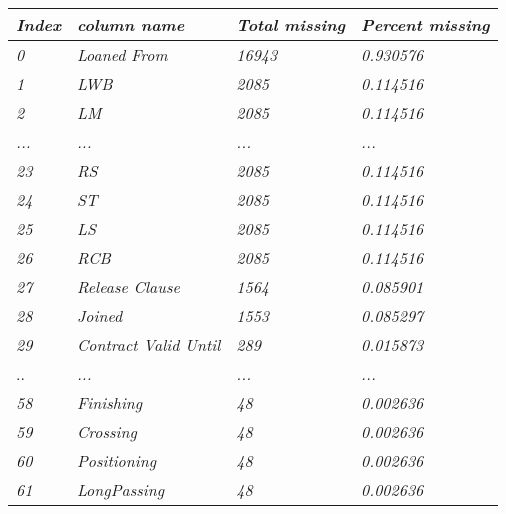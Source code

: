 \documentclass{article}
\begin{document}
\begin{table}[]
\begin{tabular}{|l|l|l|l|}
\hline
\textit{Index} & \textit{column name}          & \textit{Total missing} & \textit{Percent missing} \\ \hline
\textit{0}     & \textit{Loaned From}          & \textit{16943}         & \textit{0.930576}        \\ \hline
\textit{1}     & \textit{LWB}                  & \textit{2085}          & \textit{0.114516}        \\ \hline
\textit{2}     & \textit{LM}                   & \textit{2085}          & \textit{0.114516}        \\ \hline
\textit{...}   & \textit{...}                  & \textit{...}           & \textit{...}             \\ \hline
\textit{23}    & \textit{RS}                   & \textit{2085}          & \textit{0.114516}        \\ \hline
\textit{24}    & \textit{ST}                   & \textit{2085}          & \textit{0.114516}        \\ \hline
\textit{25}    & \textit{LS}                   & \textit{2085}          & \textit{0.114516}        \\ \hline
\textit{26}    & \textit{RCB}                  & \textit{2085}          & \textit{0.114516}        \\ \hline
\textit{27}    & \textit{Release Clause}       & \textit{1564}          & \textit{0.085901}        \\ \hline
\textit{28}    & \textit{Joined}               & \textit{1553}          & \textit{0.085297}        \\ \hline
\textit{29}    & \textit{Contract Valid Until} & \textit{289}           & \textit{0.015873}        \\ \hline
..             & \textit{...}                  & \textit{...}           & \textit{...}             \\ \hline
\textit{58}    & \textit{Finishing}            & \textit{48}            & \textit{0.002636}        \\ \hline
\textit{59}    & \textit{Crossing}             & \textit{48}            & \textit{0.002636}        \\ \hline
\textit{60}    & \textit{Positioning}          & \textit{48}            & \textit{0.002636}        \\ \hline
\textit{61}    & \textit{LongPassing}          & \textit{48}            & \textit{0.002636}        \\ \hline

\end{tabular}
\end{table}
\end{document}
